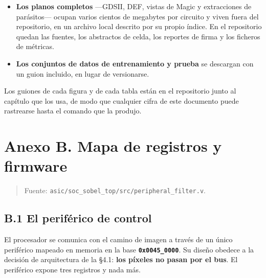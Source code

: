 \begin{itemize}
\tightlist
\item
  \textbf{Los planos completos} ---GDSII, DEF, vistas de Magic y
  extracciones de parásitos--- ocupan varios cientos de megabytes por
  circuito y viven fuera del repositorio, en un archivo local descrito
  por su propio índice. En el repositorio quedan las fuentes, los
  abstractos de celda, los reportes de firma y los ficheros de métricas.
\item
  \textbf{Los conjuntos de datos de entrenamiento y prueba} se descargan
  con un guion incluido, en lugar de versionarse.
\end{itemize}

Los guiones de cada figura y de cada tabla están en el repositorio junto
al capítulo que los usa, de modo que cualquier cifra de este documento
puede rastrearse hasta el comando que la produjo.

\section{Anexo B. Mapa de registros y
firmware}\label{anexo-b.-mapa-de-registros-y-firmware}

\begin{quote}
Fuente: \texttt{asic/soc\_sobel\_top/src/peripheral\_filter.v}.
\end{quote}

\subsection{B.1 El periférico de
control}\label{b.1-el-perifuxe9rico-de-control}

El procesador se comunica con el camino de imagen a través de un único
periférico mapeado en memoria en la base \textbf{\texttt{0x0045\_0000}}.
Su diseño obedece a la decisión de arquitectura de la §4.1: \textbf{los
píxeles no pasan por el bus}. El periférico expone tres registros y nada
más.

